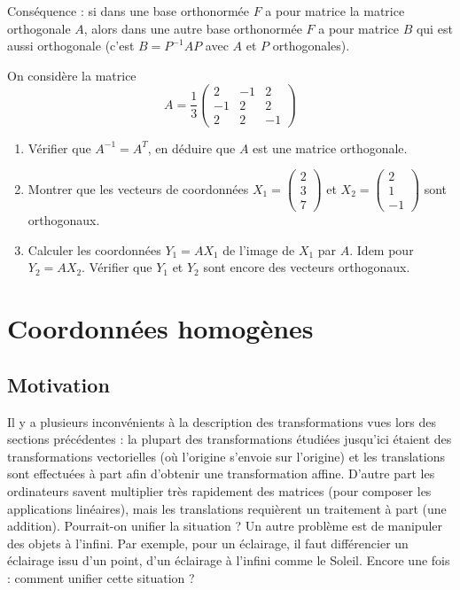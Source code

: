 \documentclass[11pt,class=report,crop=false]{standalone}
\begin{document}
Conséquence : si dans une base orthonormée $F$ a pour matrice la matrice orthogonale $A$, alors dans une autre base orthonormée $F$ a pour matrice $B$ qui est aussi orthogonale (c'est $B = P^{-1}AP$ avec $A$ et $P$ orthogonales).

\begin{exercicecours}
On considère la matrice 
$$A = 
\frac13
\begin{pmatrix}
2 & -1 & 2 \\
-1 & 2 & 2 \\
2 & 2 & -1
\end{pmatrix}$$
\begin{enumerate}
	\item Vérifier que $A^{-1} = A^T$, en déduire que $A$ est une matrice orthogonale.
	\item Montrer que les vecteurs de coordonnées
	$X_1 = \begin{pmatrix}2\\3\\7\end{pmatrix}$ et 
    $X_2 = \begin{pmatrix}2\\1\\-1\end{pmatrix}$ sont orthogonaux.
    
    \item Calculer les coordonnées $Y_1 = A X_1$ de l'image de $X_1$ par $A$. Idem pour $Y_2 = A X_2$. Vérifier que $Y_1$ et $Y_2$ sont encore des vecteurs orthogonaux.
\end{enumerate}
\end{exercicecours}


\section{Coordonnées homogènes}


\subsection{Motivation} 

Il y a plusieurs inconvénients à la description des transformations vues lors des sections précédentes :
la plupart des transformations étudiées jusqu'ici étaient des transformations vectorielles (où l'origine s'envoie sur l'origine) et les translations sont effectuées à part afin d'obtenir une transformation affine. D'autre part les ordinateurs savent multiplier très rapidement des matrices (pour composer les applications linéaires), mais les translations requièrent un traitement à part (une addition). Pourrait-on unifier la situation ?
Un autre problème est de manipuler des objets à l'infini. Par exemple, pour un éclairage, il faut différencier un éclairage issu d'un point, d'un éclairage \og{}à l'infini\fg{} comme le Soleil. Encore une fois : comment unifier cette situation ?
\end{document}
